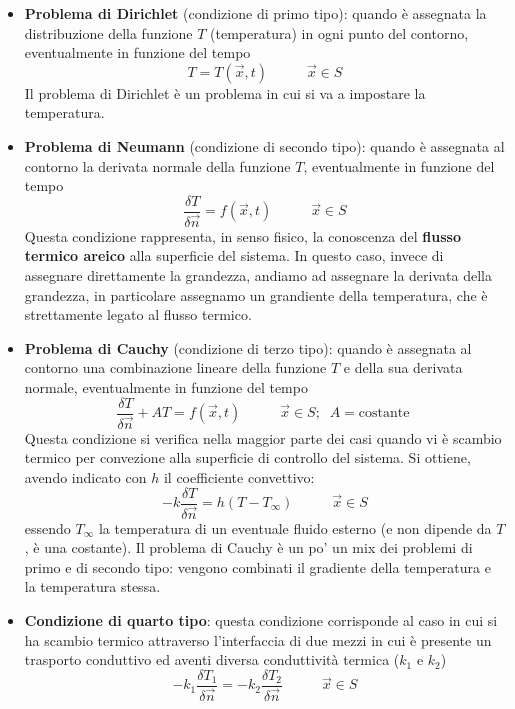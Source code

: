 \begin{itemize}
    \item \textbf{Problema di Dirichlet} (condizione di primo tipo): quando è assegnata la distribuzione della funzione $T$ (temperatura) in ogni punto del contorno, eventualmente in funzione del tempo
    \[
        T = T(\vec{x},t) \;\;\;\;\;\;\;\;\;\;\vec{x} \in S
    \]
    Il problema di Dirichlet è un problema in cui si va a impostare la temperatura.
    \item \textbf{Problema di Neumann} (condizione di secondo tipo): quando è assegnata al contorno la derivata normale della funzione $T$, eventualmente in funzione del tempo
    \[
        \frac{\delta T}{\delta \vec{n}} = f(\vec{x},t) \;\;\;\;\;\;\;\;\;\; \vec{x} \in S
    \]
    Questa condizione rappresenta, in senso fisico, la conoscenza del \textbf{flusso termico areico} alla superficie del sistema.\newline
    \newline
    In questo caso, invece di assegnare direttamente la grandezza, andiamo ad assegnare la derivata della grandezza, in particolare assegnamo un grandiente della temperatura, che è strettamente legato al flusso termico.
    \item \textbf{Problema di Cauchy} (condizione di terzo tipo): quando è assegnata al contorno una combinazione lineare della funzione $T$ e della sua derivata normale, eventualmente in funzione del tempo
    \[
        \frac{\delta T}{\delta \vec{n}} + A T = f(\vec{x}, t) \;\;\;\;\;\;\;\;\;\; \vec{x} \in S; \;\; A = \text{costante}\;
    \]
    Questa condizione si verifica nella maggior parte dei casi quando vi è scambio termico per convezione alla superficie di controllo del sistema. Si ottiene, avendo indicato con $h$ il coefficiente convettivo:
    \[
        -k \frac{\delta T}{\delta \vec{n}} = h (T-T_{\infty}) \;\;\;\;\;\;\;\;\;\; \vec{x} \in S
    \]
    essendo $T_{\infty}$ la temperatura di un eventuale fluido esterno (e non dipende da $T$, è una costante).\newline
    \newline
    Il problema di Cauchy è un po' un mix dei problemi di primo e di secondo tipo: vengono combinati il gradiente della temperatura e la temperatura stessa.
    \item \textbf{Condizione di quarto tipo}: questa condizione corrisponde al caso in cui si ha scambio termico attraverso l'interfaccia di due mezzi in cui è presente un trasporto conduttivo ed aventi diversa conduttività termica ($k_1$ e $k_2$)
    \[
        -k_1 \frac{\delta T_1}{\delta \vec{n}} = -k_2 \frac{\delta T_2}{\delta \vec{n}} \;\;\;\;\;\;\;\;\;\; \vec{x} \in S
\]
\end{itemize}
